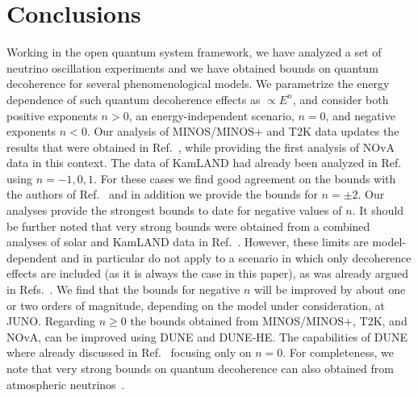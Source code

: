 \documentclass[aps, prd, onecolumn, tightenlines, notitlepage, superscriptaddress, nofootinbib, preprintnumbers, floatfix,showkeys,11pt]{revtex4-2}
\begin{document}
\section{Conclusions}
\label{sec:concl}
Working in the open quantum system framework, we have analyzed a set of neutrino oscillation experiments and we have obtained bounds on quantum decoherence for several phenomenological models.
We parametrize the energy dependence of such quantum decoherence effects as $\propto E^{n}$, and consider both positive exponents $n>0$, an energy-independent scenario, $n=0$, and negative exponents $n<0$.
Our analysis of MINOS/MINOS+ and T2K data updates the results that were obtained in Ref.~\cite{Gomes:2020muc}, while providing the first analysis of NOvA data in this context. The data of KamLAND had already been analyzed in Ref.~\cite{BalieiroGomes:2016ykp} using $n=-1,0,1$. For these cases we find good agreement on the bounds with the authors of Ref.~\cite{BalieiroGomes:2016ykp} and in addition we provide the bounds for $n=\pm 2$. Our analyses provide the strongest bounds to date for negative values of $n$. It should be further noted that very strong bounds were obtained from a combined analyses of solar and KamLAND data in Ref.~\cite{Fogli:2007tx}. However, these limits are model-dependent and in particular do not apply to a scenario in which only decoherence effects are included (as it is always the case in this paper), as was already argued in Refs.~\cite{BalieiroGomes:2016ykp,Guzzo:2014jbp}. We find that the bounds for negative $n$ will be improved by about one or two orders of magnitude, depending on the model under consideration, at JUNO. Regarding $n\geq0$ the bounds obtained from MINOS/MINOS+, T2K, and NOvA, can be improved using DUNE and DUNE-HE. The capabilities of DUNE where already discussed in Ref.~\cite{BalieiroGomes:2018gtd} focusing only on $n=0$. For completeness, we note that very strong bounds on quantum decoherence can also obtained from atmospheric neutrinos~\cite{Coloma:2018idr}.
\end{document}
